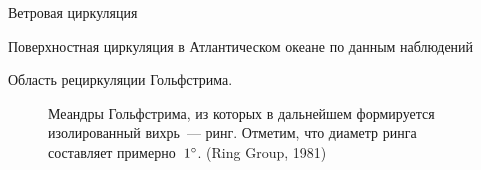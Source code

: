 \begin{chapter}{Ветровая циркуляция}
\begin{section}{Поверхностная циркуляция в Атлантическом океане по данным наблюдений}
\begin{paragraph}{Область рециркуляции Гольфстрима.}
\begin{figure}[t!]
\caption{Меандры Гольфстрима, из которых в дальнейшем формируется изолированный
вихрь~--- ринг. Отметим, что диаметр ринга составляет 
примерно~${1}^\circ$. (Ring Group, 1981)}
\label{fig:ringformation}
\end{figure}
%
%


\end{paragraph}
\end{section}
\end{chapter}
